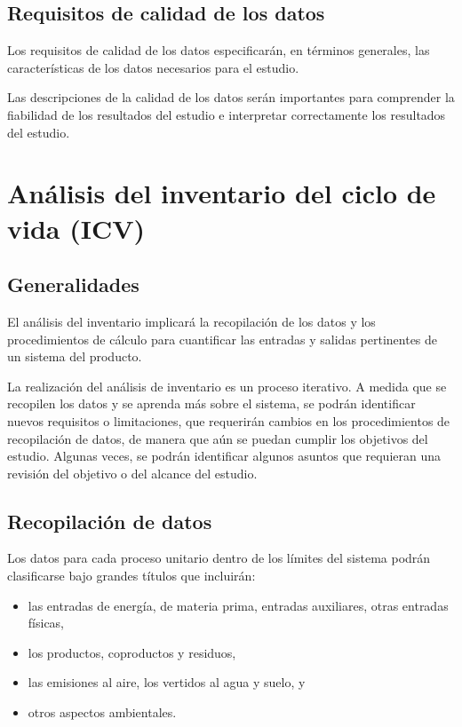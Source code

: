 \subsection{Requisitos de calidad de los datos}

Los requisitos de calidad de los datos especificarán, en términos generales, las características de los datos necesarios para el estudio.

Las descripciones de la calidad de los datos serán importantes para comprender la fiabilidad de los resultados del estudio e interpretar correctamente los resultados del estudio.

\section{Análisis del inventario del ciclo de vida (ICV)}
\subsection{Generalidades}
El análisis del inventario implicará la recopilación de los datos y los procedimientos de cálculo para cuantificar las entradas y salidas pertinentes de un sistema del producto.

La realización del análisis de inventario es un proceso iterativo. A medida que se recopilen los datos y se aprenda más sobre el sistema, se podrán identificar nuevos requisitos o limitaciones, que requerirán cambios en los procedimientos de recopilación de datos, de manera que aún se puedan cumplir los objetivos del estudio. Algunas veces, se podrán identificar algunos asuntos que requieran una revisión del objetivo o del alcance del estudio.

\subsection{Recopilación de datos}

Los datos para cada proceso unitario dentro de los límites del sistema podrán clasificarse bajo grandes títulos que incluirán:
\begin{itemize}
  \item las entradas de energía, de materia prima, entradas auxiliares, otras entradas físicas,
  \item los productos, coproductos y residuos,
  \item las emisiones al aire, los vertidos al agua y suelo, y
  \item otros aspectos ambientales.
\end{itemize}


